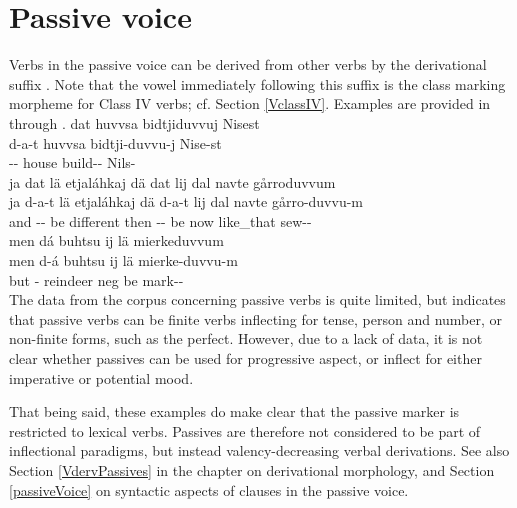 \section{Passive voice}\label{passiveVinflection}
Verbs in the passive voice can be derived from other verbs by the derivational suffix . Note that the vowel immediately following this suffix is the class marking morpheme for Class IV verbs; cf. Section \ref{VclassIV}. 
Examples are provided in  through . 
\ea\label{passEx4}%
\glll	dat huvvsa bidtjiduvvuj Nisest\\
	d-a-t huvvsa bidtji-duvvu-j Nise-st\\
	-- house\BS{} build-- Nils-\\\nopagebreak
{}	
\z
\ea\label{passEx1a}%
\glll	ja dat lä etjaláhkaj dä dat lij dal navte gårroduvvum\\
	ja d-a-t lä etjaláhkaj dä d-a-t lij dal navte gårro-duvvu-m\\
	and -- be\BS{} different then -- be\BS{} now like\_that sew--\\\nopagebreak
{}	
\z
\ea\label{passEx1b}%
\glll	men dá buhtsu ij lä mierkeduvvum\\
	men d-á buhtsu ij lä mierke-duvvu-m\\
	but -\BS{} reindeer\BS{} neg\BS{} be\BS{} mark--\\\nopagebreak
{}	
\z
The data from the corpus concerning passive verbs is quite limited, but indicates that passive verbs can be finite verbs inflecting for tense, person and number, or non-finite forms, such as the perfect. However, due to a lack of data, it is not clear whether passives can be used for progressive aspect, or inflect for either imperative or potential mood. 

That being said, these examples do make clear that the passive marker is restricted to lexical verbs. %
Passives are therefore not considered to be part of inflectional paradigms, but instead valency-decreasing verbal derivations. See also Section \ref{VdervPassives} in the chapter on derivational morphology, and Section \ref{passiveVoice} on syntactic aspects of clauses in the passive voice. 

